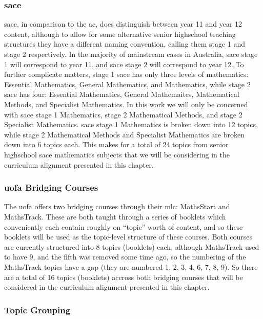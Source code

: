 \documentclass[twoside,12pt,a4paper]{report}
\begin{document}
\subsubsection{\gls{sace}}

\gls{sace}, in comparison to the \gls{ac}, does distinguish between year 11 and year 12 content, although to allow for some alternative senior highschool teaching structures they have a different naming convention, calling them stage 1 and stage 2 respectively. In the majority of mainstream cases in Australia, \gls{sace} stage 1 will correspond to year 11, and \gls{sace} stage 2 will correspond to year 12. To further complicate matters, stage 1 \gls{sace} has only three levels of mathematics: Essential Mathematics, General Mathematics, and Mathematics, while stage 2 \gls{sace} has four: Essential Mathematics, General Mathemaitcs, Mathematical Methods, and Specialist Mathematics. In this work we will only be concerned with \gls{sace} stage 1 Mathematics, stage 2 Mathematical Methods, and stage 2 Specialist Mathematics. \gls{sace} stage 1 Mathematics is broken down into 12 topics, while stage 2 Mathematical Methods and Specialist Mathematics are broken down into 6 topics each. This makes for a total of 24 topics from senior highschool \gls{sace} mathematics subjects that we will be considering in the curriculum alignment presented in this chapter.

\subsubsection{\gls{uofa} Bridging Courses}

The \gls{uofa} offers two bridging courses through their \gls{mlc}: MathsStart and MathsTrack. These are both taught through a series of booklets which conveniently each contain roughly on ``topic'' worth of content, and so these booklets will be used as the topic-level structure of these courses. Both courses are currently structured into 8 topics (booklets) each, although MathsTrack used to have 9, and the fifth was removed some time ago, so the numbering of the MathsTrack topics have a gap (they are numbered 1, 2, 3, 4, 6, 7, 8, 9). So there are a total of 16 topics (booklets) accross both bridging courses that will be considered in the curriculum alignment presented in this chapter.

\subsubsection{Topic Grouping}
\end{document}
